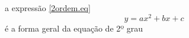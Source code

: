 a expressão \ref{2ordem.eq}
\begin{equation}
y = ax^2 + bx + c \label{2ordem.eq}
\end{equation}
é a forma geral da equação de 2º grau

